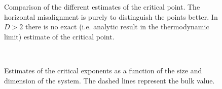 \documentclass[a4paper, 11pt]{article}
\begin{document}
    \begin{figure}[H]
      \centering
      \begin{subfigure}[]{
        \label{fig:D2_k_c}}
      \end{subfigure}
      \begin{subfigure}[]{
        \label{fig:D3_k_c}}
      \end{subfigure}
      \begin{subfigure}[]{
        \label{fig:D4_k_c}}
      \end{subfigure}
      \caption{Comparison of the different estimates of the critical point. The horizontal misalignment is purely to distinguish the points better. In $D > 2$ there is no exact (i.e. analytic result in the thermodynamic limit) estimate of the critical point.}
    \end{figure}

    \begin{figure}[H]
      \centering
      \begin{subfigure}[Solid $\alpha_1$, dotted $\alpha_2$]{
        \label{fig:alphas}}
      \end{subfigure}
      \begin{subfigure}[]{
        \label{fig:betas}}
      \end{subfigure} \\
      \begin{subfigure}[Solid $\gamma_1$, dotted $\gamma_2$]{
        \label{fig:gammas}}
      \end{subfigure}
      \begin{subfigure}[]{
        \label{fig:deltas}}
      \end{subfigure}
      \caption{Estimates of the critical exponents as a function of the size and dimension of the system. The dashed lines represent the bulk value.}
    \end{figure}
\end{document}
